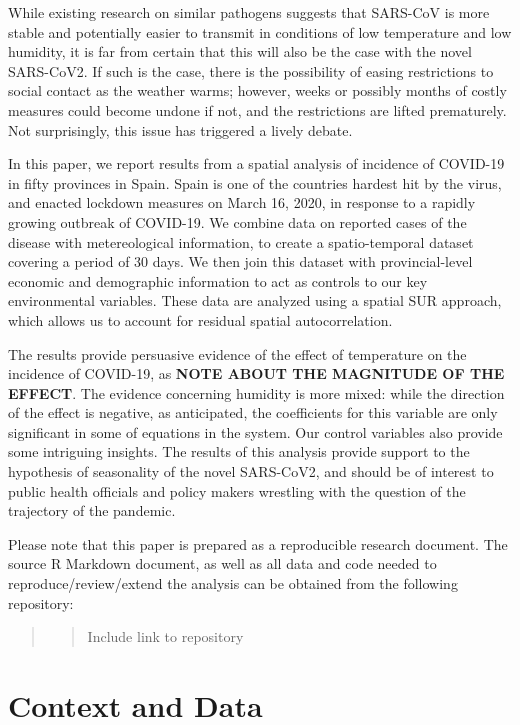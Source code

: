 \documentclass[]{elsarticle} %
\begin{document}
While existing research on similar pathogens suggests that SARS-CoV is
more stable and potentially easier to transmit in conditions of low
temperature and low humidity, it is far from certain that this will also
be the case with the novel SARS-CoV2. If such is the case, there is the
possibility of easing restrictions to social contact as the weather
warms; however, weeks or possibly months of costly measures could become
undone if not, and the restrictions are lifted prematurely. Not
surprisingly, this issue has triggered a lively debate.

In this paper, we report results from a spatial analysis of incidence of
COVID-19 in fifty provinces in Spain. Spain is one of the countries
hardest hit by the virus, and enacted lockdown measures on March 16,
2020, in response to a rapidly growing outbreak of COVID-19. We combine
data on reported cases of the disease with metereological information,
to create a spatio-temporal dataset covering a period of 30 days. We
then join this dataset with provincial-level economic and demographic
information to act as controls to our key environmental variables. These
data are analyzed using a spatial SUR approach, which allows us to
account for residual spatial autocorrelation.

The results provide persuasive evidence of the effect of temperature on
the incidence of COVID-19, as \textbf{NOTE ABOUT THE MAGNITUDE OF THE
EFFECT}. The evidence concerning humidity is more mixed: while the
direction of the effect is negative, as anticipated, the coefficients
for this variable are only significant in some of equations in the
system. Our control variables also provide some intriguing insights. The
results of this analysis provide support to the hypothesis of
seasonality of the novel SARS-CoV2, and should be of interest to public
health officials and policy makers wrestling with the question of the
trajectory of the pandemic.

Please note that this paper is prepared as a reproducible research
document. The source R Markdown document, as well as all data and code
needed to reproduce/review/extend the analysis can be obtained from the
following repository:

\begin{quote}
\begin{quote}
Include link to repository
\end{quote}
\end{quote}

\hypertarget{context-and-data}{%
\section{Context and Data}\label{context-and-data}}
\end{document}
